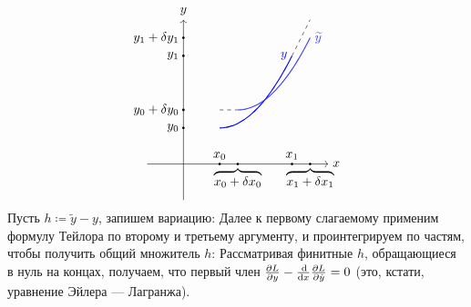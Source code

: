 \documentclass[a4paper]{article}
\begin{document}
    \[\begin{tikzpicture}
        \draw[->] (-1, 0) -- (4, 0) node[right] {$x$};
        \draw[->] (0, -1) -- (0, 4) node[above] {$y$};
        \fill (1, 0) circle(1pt) node[above]{$x_0$};
        \fill (1.5, 0) circle(1pt) node[below]{$\overbrace{x_0 + \delta x_0}$};
        \fill (3, 0) circle(1pt) node[above]{$x_1$};
        \fill (3.5, 0) circle(1pt) node[below]{$\overbrace{x_1 + \delta x_1}$};
        \fill (0, 1) circle(1pt) node[left]{$y_0$};
        \fill (0, 1.5) circle(1pt) node[left]{$y_0 + \delta y_0$};
        \fill (0, 3) circle(1pt) node[left]{$y_1$};
        \fill (0, 3.5) circle(1pt) node[left]{$y_1 + \delta y_1$};
        \draw[scale=1,domain=1:3,smooth,blue,thick] plot ({\x},{0.5 * \x * \x - \x + 1.5}) node[left]{$y$};
        \draw[scale=1,domain=1:3,smooth,lightblue,thick] plot ({\x+0.5},{0.5 * \x * \x - \x + 2}) node[right] {$\tilde{y}$};
          \draw[dashed] (1, 1.5) -- (1.5, 1.5);
          \draw[dashed] (3, 3) -- (3.5, 4);
    \end{tikzpicture}\]
    Пусть $h \coloneqq \tilde{y} - y$, запишем вариацию:
    Далее к первому слагаемому применим формулу Тейлора по второму и третьему аргументу, и проинтегрируем по частям, чтобы получить общий множитель $h$:
    Рассматривая финитные $h$, обращающиеся в нуль на концах, получаем, что первый член $\frac{\partial L}{\partial y} - \frac{\operatorname{d}\!}{\operatorname{d}\! x}\frac{\partial L}{\partial \dot{y}} = 0$ (это, кстати, уравнение Эйлера --- Лагранжа).
\end{document}
